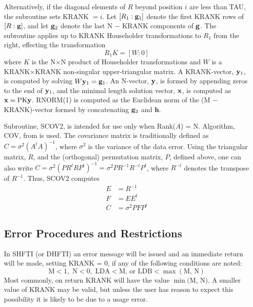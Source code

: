 \documentclass[twoside]{MATH77}
\begin{document}
Alternatively, if the diagonal elements of $R$ beyond position $i$ are less
than TAU, the subroutine sets KRANK $=i$. Let $[R_1:{\bf g}_1]$ denote the
first KRANK rows of $[R:{\bf g}]$, and let ${\bf g}_2$ denote the last
N $-$ KRANK components of ${\bf g}$. The subroutine applies up to KRANK
Householder transformations to $R_1$ from the right, effecting the
transformation
\begin{equation*}
R_1K=[W:0]
\end{equation*}
where $K$ is the N$\times $N product of Householder transformations and $W$ is a
KRANK$\times $KRANK non-singular upper-triangular matrix. A KRANK-vector, $%
{\bf y}_1$, is computed by solving $W{\bf y}_1={\bf g}_1$. An N-vector, $%
{\bf y}$, is formed by appending zeros to the end of ${\bf y}_1$, and the
minimal length solution vector, ${\bf x}$, is computed as ${\bf x}=\text{PK}%
{\bf y}$. RNORM(1) is computed as the Euclidean norm of the (M $-$ KRANK)-vector
formed by concatenating ${\bf g}_2$ and ${\bf h}.$

Subroutine, SCOV2, is intended for use only when Rank($A$) = N.
Algorithm, COV, from \cite{Lawson:1974:SLS} is used.  The covariance
matrix is traditionally defined as $ C=\sigma ^2(A^tA)^{-1}$, where
$\sigma ^2$ is the variance of the data error.  Using the triangular
matrix, $R$, and the (orthogonal) permutation matrix, $P$, defined above,
one can also write $C=\sigma ^2(PR^tRP^t)^{-1}=\sigma ^2PR^{-1}R^{-t}P^t$,
where $R^{-t}$ denotes the transpose of $R^{-1}$.  Thus, SCOV2 computes%
\begin{align*}
E&=R^{-1} \\ F&=EE^t\\ C&=\sigma ^2PFP^t
\end{align*}





\subsection{Error Procedures and Restrictions}

In SHFTI (or DHFTI) an error message will be issued and an immediate return
will be made, setting KRANK = 0, if any of the following conditions are
noted:%
\begin{equation*}
\text{M}<1,\text{ N}<0,\text{ LDA}<\text{M, or LDB}<\max (\text{M, N})
\end{equation*}
Most commonly, on return KRANK will have the value $\min (\text{M}$, N$)$.
A smaller value of KRANK may be valid, but unless the user has reason to
expect this possibility it is likely to be due to a usage error.
\end{document}
